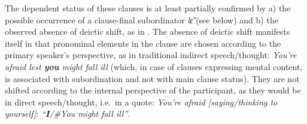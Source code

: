 \documentclass[output=paper,colorlinks,citecolor=brown]{langscibook}
\begin{document}
\ea \label{ex:Fed39}
\z
\z


The dependent status of these clauses is at least partially confirmed by a) the possible occurrence of a clause-final subordinator \textit{lɛ̌} (see below) and b) the observed absence of deictic shift, as in . The absence of deictic shift manifests itself in that pronominal elements in the clause are chosen according to the primary speaker's perspective, as in traditional indirect speech/thought: \textit{You're afraid lest \textbf{you} might fall ill} (which, in case of clauses expressing mental content, is associated with subordination and not with main clause status). They are not shifted according to the internal perspective of the participant, as they would be in direct speech\slash thought, i.e.\ in a quote: \textit{You're afraid \textup{[}saying\slash thinking to yourself\textup{]}}: \textit{\mbox{``\textbf{I}/\#You} might fall ill''}.


\z
\end{document}
